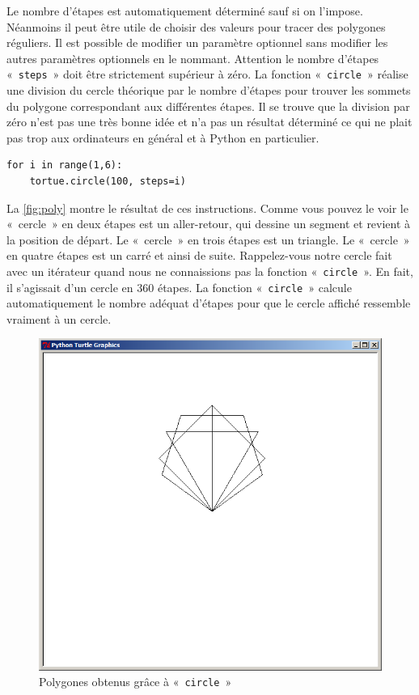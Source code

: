 Le nombre d'étapes est automatiquement déterminé sauf si on l'impose. Néanmoins il peut être utile de choisir des valeurs pour tracer des polygones réguliers. Il est possible de modifier un paramètre optionnel sans modifier les autres paramètres optionnels en le nommant. Attention le nombre d'étapes « \texttt{steps} » doit être strictement supérieur à zéro. La fonction « \texttt{circle} » réalise une division du cercle théorique par le nombre d'étapes pour trouver les sommets du polygone correspondant aux différentes étapes. Il se trouve que la division par zéro n'est pas une très bonne idée et n'a pas un résultat déterminé ce qui ne plait pas trop aux ordinateurs en général et à Python en particulier.

\begin{Verbatim}[frame=single,rulecolor=\color{mbleu}, label=à taper]
for i in range(1,6):
	tortue.circle(100, steps=i)
\end{Verbatim}


La \autoref{fig:poly} montre le résultat de ces instructions. 
Comme vous pouvez le voir le « cercle » en deux étapes est un aller-retour, qui dessine un segment et revient à la position de départ.
Le « cercle » en trois étapes est un triangle. Le « cercle » en quatre étapes est un carré et ainsi de suite. 
Rappelez-vous notre cercle fait avec un itérateur quand nous ne connaissions pas la fonction « \texttt{circle} ».
En fait, il s'agissait d'un cercle en 360 étapes. La fonction « \texttt{circle} » calcule automatiquement le nombre adéquat d'étapes pour que le cercle affiché ressemble vraiment à un cercle.

\begin{figure}[H]
\centering
\includegraphics[scale=0.4]{images/poly}
\caption{Polygones obtenus grâce à « \texttt{circle} »}\label{fig:poly}
\end{figure}

